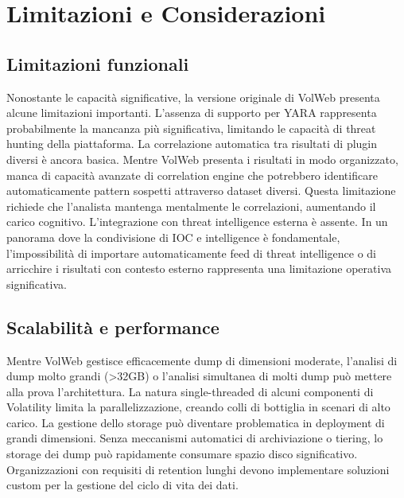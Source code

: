 \section{Limitazioni e Considerazioni}
\subsection{Limitazioni funzionali}
Nonostante le capacità significative, la versione originale di VolWeb presenta alcune limitazioni importanti. L'assenza di supporto per YARA rappresenta probabilmente la mancanza più significativa, limitando le capacità di threat hunting della piattaforma.
La correlazione automatica tra risultati di plugin diversi è ancora basica. Mentre VolWeb presenta i risultati in modo organizzato, manca di capacità avanzate di correlation engine che potrebbero identificare automaticamente pattern sospetti attraverso dataset diversi. Questa limitazione richiede che l'analista mantenga mentalmente le correlazioni, aumentando il carico cognitivo.
L'integrazione con threat intelligence esterna è assente. In un panorama dove la condivisione di IOC e intelligence è fondamentale, l'impossibilità di importare automaticamente feed di threat intelligence o di arricchire i risultati con contesto esterno rappresenta una limitazione operativa significativa.

\subsection{Scalabilità e performance}
Mentre VolWeb gestisce efficacemente dump di dimensioni moderate, l'analisi di dump molto grandi (>32GB) o l'analisi simultanea di molti dump può mettere alla prova l'architettura. La natura single-threaded di alcuni componenti di Volatility limita la parallelizzazione, creando colli di bottiglia in scenari di alto carico.
La gestione dello storage può diventare problematica in deployment di grandi dimensioni. Senza meccanismi automatici di archiviazione o tiering, lo storage dei dump può rapidamente consumare spazio disco significativo. Organizzazioni con requisiti di retention lunghi devono implementare soluzioni custom per la gestione del ciclo di vita dei dati.

